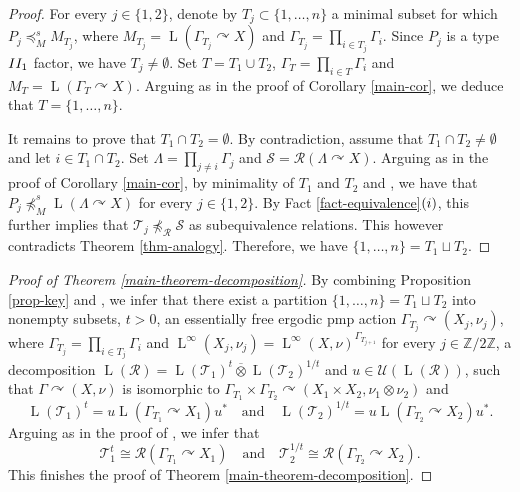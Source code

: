\documentclass[11pt]{amsart}
\numberwithin{equation}{section}
\theoremstyle{plain}
\theoremstyle{definition}
\newcommand{\Z}{\mathbb{Z}}
\newcommand{\ovt}{\mathbin{\overline{\otimes}}}
\newcommand{\rL}{\operatorname{L}}
\begin{document}
\begin{proof}
For every $j \in \{1, 2\}$, denote by $T_j \subset \{1, \dots, n\}$ a minimal subset for which $P_j \preceq^s_{M} M_{T_j}$, where $M_{T_j} = \rL(\Gamma_{T_j} \curvearrowright X)$ and $\Gamma_{T_j} = \prod_{i \in T_j} \Gamma_i$. Since $P_j$ is a type ${\rm II_1}$ factor, we have $T_j \neq \emptyset$. Set $T = T_1 \cup T_2$, $\Gamma_T = \prod_{i \in T} \Gamma_i$ and $M_T =\rL(\Gamma_T \curvearrowright X)$. Arguing as in the proof of Corollary \ref{main-cor}, we deduce that $T = \{1, \dots, n\}$.

It remains to prove that $T_1 \cap T_2 = \emptyset$. By contradiction, assume that $T_1 \cap T_2 \neq \emptyset$ and let $i \in T_1 \cap T_2$. Set $\Lambda = \prod_{j \neq i} \Gamma_j$ and $\mathscr S = \mathscr R(\Lambda \curvearrowright X)$. Arguing as in the proof of Corollary \ref{main-cor}, by minimality of $T_1$ and $T_2$ and \cite[Lemma 2.8(2)]{DHI16}, we have that $P_j \npreceq_M^s \rL(\Lambda \curvearrowright X)$ for every $j \in \{1, 2\}$. By Fact \ref{fact-equivalence}$(\rm i)$, this further implies that $\mathscr T_j \npreceq_{\mathscr R} \mathscr S$ as subequivalence relations. This however contradicts Theorem \ref{thm-analogy}. Therefore, we have $\{1, \dots, n\} = T_1 \sqcup T_2$.
 \end{proof}





\begin{proof}[Proof of Theorem \ref{main-theorem-decomposition}]
By combining Proposition \ref{prop-key} and \cite[Theorem 3.2]{Dr19}, we infer that there exist a partition $\{1, \dots, n\} = T_1 \sqcup T_2$ into nonempty subsets, $t > 0$, an essentially free ergodic pmp action $\Gamma_{T_j} \curvearrowright (X_j, \nu_j)$, where $\Gamma_{T_j} = \prod_{i \in T_j} \Gamma_i$ and $\rL^\infty(X_j, \nu_j) = \rL^\infty(X, \nu)^{\Gamma_{T_{j + 1}}}$ for every $j \in \Z/2\Z$, a decomposition $\rL(\mathscr R) = \rL(\mathscr T_1)^t  \ovt \rL(\mathscr T_2)^{1/t}$ and $u \in \mathscr U(\rL(\mathscr R))$, such that $\Gamma \curvearrowright (X, \nu)$ is isomorphic to $\Gamma_{T_1} \times \Gamma_{T_2} \curvearrowright (X_1 \times X_2, \nu_1 \otimes \nu_2)$ and
$$\rL(\mathscr T_1)^t = u\rL(\Gamma_{T_1} \curvearrowright X_1)u^* \quad \text{and} \quad \rL(\mathscr T_2)^{1/t} = u \rL(\Gamma_{T_2} \curvearrowright X_2)u^*.$$
Arguing as in the proof of \cite[Corollary E]{Ho15}, we infer that 
$$\mathscr T_1^t \cong \mathscr R(\Gamma_{T_1} \curvearrowright X_1) \quad \text{and} \quad \mathscr T_2^{1/t} \cong \mathscr R(\Gamma_{T_2} \curvearrowright X_2).$$
This finishes the proof of Theorem \ref{main-theorem-decomposition}.
\end{proof}
\end{document}
